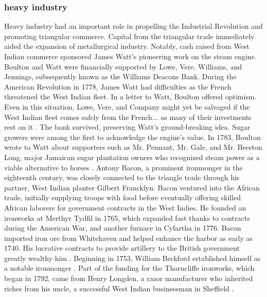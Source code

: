 \subsubsection{heavy industry}
Heavy industry had an important role in propelling the Industrial Revolution and promoting triangular commerce. Capital from the triangular trade immediately aided the expansion of metallurgical industry. Notably, cash raised from West Indian commerce sponsored James Watt's pioneering work on the steam engine. Boulton and Watt were financially supported by Lowe, Vere, Williams, and Jennings, subsequently known as the Williams Deacons Bank. During the American Revolution in 1778, James Watt had difficulties as the French threatened the West Indian fleet. In a letter to Watt, Boulton offered optimism. Even in this situation, Lowe, Vere, and Company might yet be salvaged if the West Indian fleet comes safely from the French... as many of their investments rest on it . The bank survived, preserving Watt's ground-breaking idea. Sugar growers were among the first to acknowledge the engine's value. In 1783, Boulton wrote to Watt about supporters such as Mr. Pennant, Mr. Gale, and Mr. Beeston Long, major Jamaican sugar plantation owners who recognized steam power as a viable alternative to horses . Antony Bacon, a prominent ironmonger in the eighteenth century, was closely connected to the triangle trade through his partner, West Indian planter Gilbert Francklyn. Bacon ventured into the African trade, initially supplying troops with food before eventually offering skilled African laborers for government contracts in the West Indies. He founded an ironworks at Merthyr Tydfil in 1765, which expanded fast thanks to contracts during the American War, and another furnace in Cyfartha in 1776. Bacon imported iron ore from Whitehaven and helped enhance the harbor as early as 1740. His lucrative contracts to provide artillery to the British government greatly wealthy him . Beginning in 1753, William Beckford established himself as a notable ironmonger . Part of the funding for the Thorncliffe ironworks, which began in 1792, came from Henry Longden, a razor manufacturer who inherited riches from his uncle, a successful West Indian businessman in Sheffield .
